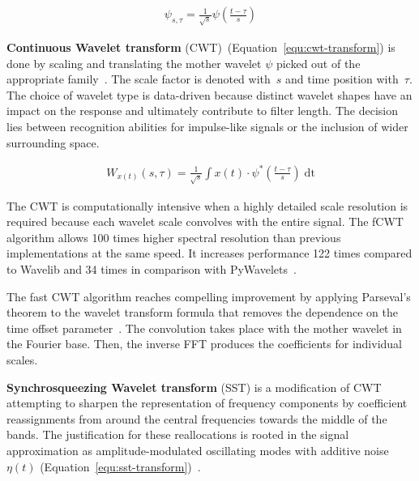 \begin{ceqn}\begin{align}
\psi_{s, \tau} = \frac{1}{\sqrt{s}}\psi\left(\frac{t - \tau}{s}\right)
\label{equ:mother-wavelet}
\end{align}\end{ceqn}

\textbf{Continuous Wavelet transform} (CWT)~(Equation~\ref{equ:cwt-transform}) is done by scaling and translating the mother wavelet $\psi$ picked out of the appropriate family~\cite{nandi_condition_2019}. The scale factor is denoted with~$s$ and time position with~$\tau$. The choice of wavelet type is data-driven because distinct wavelet shapes have an impact on the response and ultimately contribute to filter length. The decision lies between recognition abilities for impulse-like signals or the inclusion of wider surrounding space.

\begin{ceqn}\begin{align}
W_{x(t)}(s, \tau) = \frac{1}{\sqrt{s}}\int x(t) \cdot \psi^*\left(\frac{t - \tau}{s}\right)\;\mathrm{dt}
\label{equ:cwt-transform}
\end{align}\end{ceqn}

The CWT is computationally intensive when a highly detailed scale resolution is required because each wavelet scale convolves with the entire signal. The fCWT algorithm allows 100 times higher spectral resolution than previous implementations at the same speed. It increases performance 122 times compared to Wavelib and 34 times in comparison with PyWavelets~\cite{arts_fast_2022}.

The fast CWT algorithm reaches compelling improvement by applying Parseval's theorem to the wavelet transform formula that removes the dependence on the time offset parameter~\cite{arts_fast_2022}. The convolution takes place with the mother wavelet in the Fourier base. Then, the inverse FFT produces the coefficients for individual scales.

\textbf{Synchrosqueezing Wavelet transform} (SST) is a modification of CWT attempting to sharpen the representation of frequency components by coefficient reassignments from around the central frequencies towards the middle of the bands. The justification for these reallocations is rooted in the signal approximation as amplitude-modulated oscillating modes with additive noise $\eta(t)$ (Equation~\ref{equ:sst-transform})~\cite{herrera_applications_2014}.

